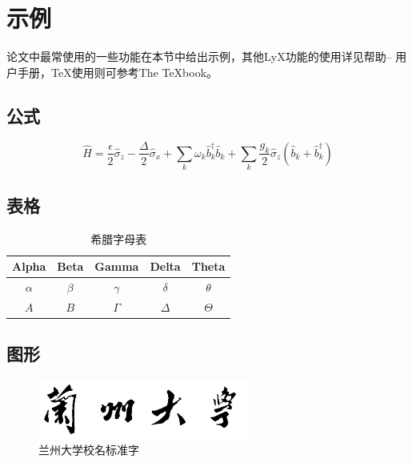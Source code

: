 \documentclass[twoside,longtitle]{LZUthesis}
\begin{document}
\section{示例}

论文中最常使用的一些功能在本节中给出示例，其他LyX功能的使用详见帮助-- 用户手册，\TeX{}使用则可参考The \TeX{}book\cite{Knut04-T}。


\subsection{公式}

\begin{equation}
\hat{H}=\frac{\epsilon}{2}\hat{\sigma}_{z}-\frac{\Delta}{2}\hat{\sigma}_{x}+\sum_{k}\omega_{k}\hat{b}_{k}^{\dagger}\hat{b}_{k}+\sum_{k}\frac{g_{k}}{2}\hat{\sigma}_{z}(\hat{b}_{k}+\hat{b}_{k}^{\dagger})\label{eq:sbm}
\end{equation}



\subsection{表格}

\begin{table}[H]
\begin{centering}
\begin{tabular}{|c|c|c|c|c|}
\hline
Alpha & Beta & Gamma & Delta & Theta\\
\hline
$\alpha$ & $\beta$ & $\gamma$ & $\delta$ & $\theta$\\
\hline
$A$ & $B$ & $\Gamma$ & $\Delta$ & $\Theta$\\
\hline
\end{tabular}
\par\end{centering}

\protect\caption{希腊字母表\label{tab:Greek}}


\end{table}



\subsection{图形}

\begin{figure}[H]
\begin{centering}
\includegraphics[width=0.618\textwidth]{figures/lzu}
\par\end{centering}

\protect\caption{兰州大学校名标准字\label{fig:lzu}}
\end{figure}
\end{document}

